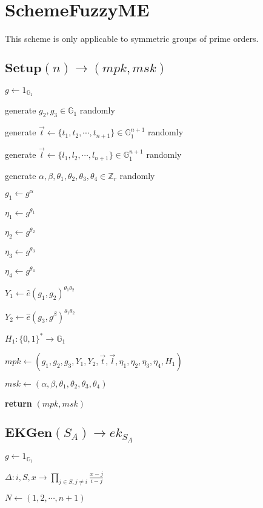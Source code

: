 \documentclass[a4paper]{article}
\begin{document}
\section{SchemeFuzzyME}

This scheme is only applicable to symmetric groups of prime orders. 

\subsection{$\textbf{Setup}(n) \rightarrow (\textit{mpk}, \textit{msk})$}

$g \gets 1_{\mathbb{G}_1}$

generate $g_2, g_3 \in \mathbb{G}_1$ randomly

generate $\vec{t} \gets \{t_1, t_2, \cdots, t_{n + 1}\} \in \mathbb{G}_1^{n + 1}$ randomly

generate $\vec{l} \gets \{l_1, l_2, \cdots, l_{n + 1}\} \in \mathbb{G}_1^{n + 1}$ randomly

generate $\alpha, \beta, \theta_1, \theta_2, \theta_3, \theta_4 \in \mathbb{Z}_r$ randomly

$g_1 \gets g^\alpha$

$\eta_1 \gets g^{\theta_1}$

$\eta_2 \gets g^{\theta_2}$

$\eta_3 \gets g^{\theta_3}$

$\eta_4 \gets g^{\theta_4}$

$Y_1 \gets \hat{e}(g_1, g_2)^{\theta_1 \theta_2}$

$Y_2 \gets \hat{e}(g_3, g^\beta)^{\theta_1 \theta_2}$

$H_1: \{0, 1\}^* \rightarrow \mathbb{G}_1$

$ \textit{mpk} \gets (g_1, g_2, g_3, Y_1, Y_2, \vec{t}, \vec{l}, \eta_1, \eta_2, \eta_3, \eta_4, H_1)$

$\textit{msk} \gets (\alpha, \beta, \theta_1, \theta_2, \theta_3, \theta_4)$

\textbf{return} $(\textit{mpk}, \textit{msk})$

\subsection{$\textbf{EKGen}(S_A) \rightarrow \textit{ek}_{S_A}$}

$g \gets 1_{\mathbb{G}_1}$

$\Delta: i, S, x \rightarrow \prod\limits_{j \in S, j \neq i} \frac{x - j}{i - j}$

$N \gets (1, 2, \cdots, n + 1)$
\end{document}
